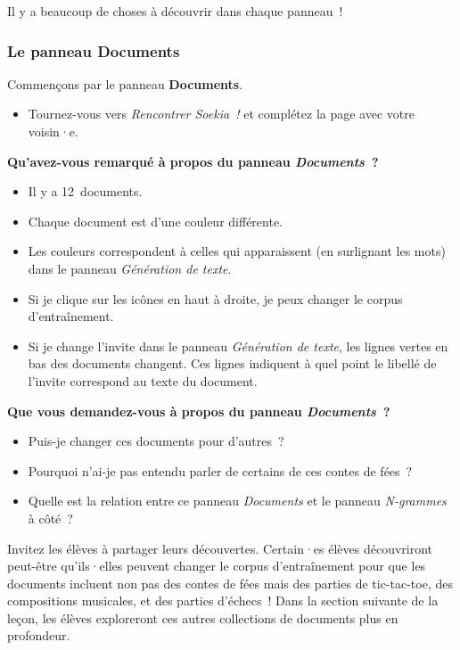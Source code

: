 \documentclass[12pt,a4paper]{article}
\begin{document}
Il y a beaucoup de choses à découvrir dans chaque panneau~!

\subsubsection{Le panneau Documents}

\begin{activitybox}
  Commençons par le panneau \textbf{Documents}.
  \begin{itemize}
    \item Tournez-vous vers \emph{Rencontrer Soekia~!} et complétez la page avec votre voisin·e.
  \end{itemize}
\end{activitybox}

\begin{thinkbox}
  \textbf{Qu'avez-vous remarqué à propos du panneau \emph{Documents}~?}
  \begin{itemize}
    \item Il y a 12~documents.
    \item Chaque document est d'une couleur différente.
    \item Les couleurs correspondent à celles qui apparaissent (en surlignant les mots) dans le panneau \emph{Génération de texte}.
    \item Si je clique sur les icônes en haut à droite, je peux changer le corpus d'entraînement.
    \item Si je change l'invite dans le panneau \emph{Génération de texte}, les lignes vertes en bas des documents changent. Ces lignes indiquent à quel point le libellé de l'invite correspond au texte du document.
  \end{itemize}

  \textbf{Que vous demandez-vous à propos du panneau \emph{Documents}~?}
  \begin{itemize}
    \item Puis-je changer ces documents pour d'autres~?
    \item Pourquoi n'ai-je pas entendu parler de certains de ces contes de fées~?
    \item Quelle est la relation entre ce panneau \emph{Documents} et le panneau \emph{N-grammes} à côté~?
  \end{itemize}
\end{thinkbox}

\begin{instructornotes}
  Invitez les élèves à partager leurs découvertes. Certain·es élèves découvriront peut-être qu'ils·elles peuvent changer le corpus d'entraînement pour que les documents incluent non pas des contes de fées mais des parties de tic-tac-toe, des compositions musicales, et des parties d'échecs~! Dans la section suivante de la leçon, les élèves exploreront ces autres collections de documents plus en profondeur.
\end{instructornotes}
\end{document}
